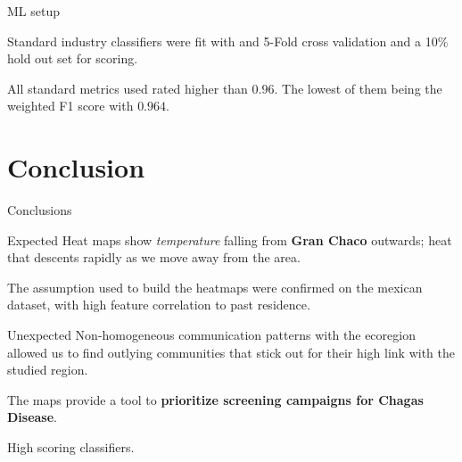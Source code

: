 \documentclass{beamer}
\begin{document}

\begin{frame}{ ML setup}

			
			Standard industry classifiers were fit with
			and 5-Fold cross validation and a 10\% hold out set for scoring.
			
			\medskip
			
			All standard metrics used rated higher than $0.96$. The lowest of them being the weighted F1 score with $0.964$.
		
%		
%			 					
%
		
\end{frame}

\section{Conclusion}

\begin{frame}{Conclusions}
	\begin{block}{Expected}
		Heat maps show \textit{temperature} falling from \textbf{Gran Chaco} outwards; heat that descents rapidly as we move away from the area.
		
		\medskip
		The assumption used to build the heatmaps were confirmed on the mexican dataset, with high feature correlation to past residence.
		
	\end{block}
	
	\pause
	
	\begin{block}{Unexpected}		
		Non-homogeneous communication patterns with the ecoregion allowed us to find outlying communities that stick out for their high link with the studied region.
		
		\medskip
		The maps provide a tool to \textbf{prioritize screening campaigns for Chagas Disease}.
		
		\medskip
		High scoring classifiers.
	\end{block}
\end{frame}
\end{document}
